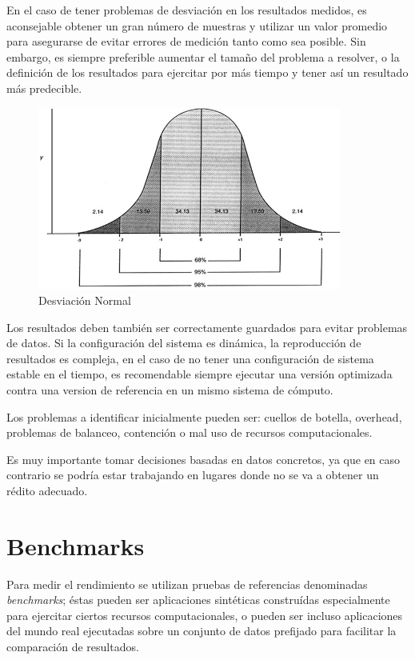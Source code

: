 \documentclass[a4paper]{report}
\begin{document}
En el caso de tener problemas de desviaci\'on en los resultados medidos, es aconsejable obtener un gran n\'umero de muestras y utilizar
un valor promedio para asegurarse de evitar errores de medici\'on tanto como sea posible. Sin embargo, es siempre preferible aumentar el tama\~no
del problema a resolver, o la definici\'on de los resultados para ejercitar por m\'as tiempo y tener as\'i un resultado m\'as predecible.

\begin{figure}[H]
\begin{center}
\includegraphics[width=10cm]{deviation.png}
\caption{Desviaci\'on Normal}
\end{center}
\end{figure}

\bigskip

Los resultados deben tambi\'en ser correctamente guardados para evitar
problemas de datos. Si la configuraci\'on del sistema es din\'amica, la reproducci\'on de resultados es compleja, en el caso de no tener una
configuraci\'on de sistema estable en el tiempo, es recomendable siempre
ejecutar una versi\'on optimizada contra una version de referencia en un mismo
sistema de c\'omputo.

\bigskip

Los problemas a identificar inicialmente pueden ser: cuellos de botella,
overhead, problemas de balanceo, contenci\'on o mal uso de recursos
computacionales.

\bigskip

Es muy importante tomar decisiones basadas en datos concretos, ya que en
caso contrario se podr\'ia estar trabajando en lugares donde no se va a obtener
un r\'edito adecuado.

\section{Benchmarks}

Para medir el rendimiento se utilizan pruebas de referencias denominadas
{\em benchmarks}; \'estas pueden ser aplicaciones sint\'eticas constru\'idas
especialmente para ejercitar ciertos recursos computacionales, o pueden ser incluso
aplicaciones del mundo real ejecutadas sobre un conjunto de datos prefijado para
facilitar la comparaci\'on de resultados.
\end{document}
